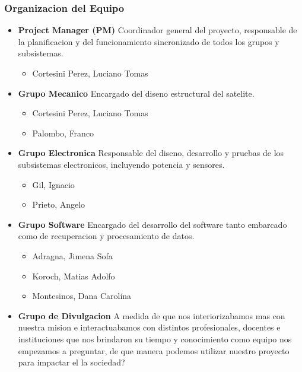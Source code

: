     \subsubsection{Organizacion del Equipo}
      \begin{itemize}
        \item \textbf{Project Manager (PM)}
          Coordinador general del proyecto, responsable de la planificacion y del funcionamiento
          sincronizado de todos los grupos y subsistemas.
          \begin{itemize}
            \item Cortesini Perez, Luciano Tomas
          \end{itemize}
        \item \textbf{Grupo Mecanico}
         Encargado del diseno estructural del satelite.
          \begin{itemize}
            \item Cortesini Perez, Luciano Tomas
            \item Palombo, Franco
          \end{itemize}
        \item \textbf{Grupo Electronica}
          Responsable del diseno, desarrollo y pruebas de los subsistemas electronicos, incluyendo
          potencia y sensores.
          \begin{itemize}
            \item Gil, Ignacio
            \item Prieto, Angelo
          \end{itemize}
          \item \textbf{Grupo Software}
          Encargado del desarrollo del software tanto embarcado como de recuperacion y procesamiento de datos.
          \begin{itemize}
            \item Adragna, Jimena Sofa
            \item Koroch, Matias Adolfo
            \item Montesinos, Dana Carolina
          \end{itemize}
        \item \textbf{Grupo de Divulgacion}
          A medida de que nos interiorizabamos mas con nuestra mision e interactuabamos con
          distintos profesionales, docentes e instituciones que nos brindaron su tiempo y conocimiento
          como equipo nos empezamos a preguntar, de que manera podemos utilizar
          nuestro proyecto para impactar el la sociedad?


\end{itemize}
